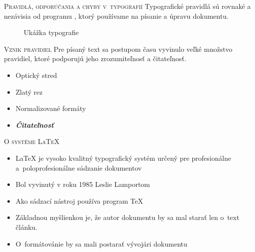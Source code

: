 \documentclass[xcolor=dvipsnames]{beamer}
\begin{document}
\begin{frame}{\textsc{\large{Pravidlá, odporúčania a chyby v~typografií}}}
	Typografické pravidlá sú rovnaké a nezávisia od programu , ktorý používame na písanie a úpravu dokumentu.
    \bigskip
    \begin{figure}
	\begin{center}
    	\caption{Ukážka typografie}
    \end{center}
\end{figure}
\end{frame}


\begin{frame}{\textsc{\large{Vznik pravidiel}}}
	Pre písaný text sa postupom času vyvinulo veľké množstvo pravidiel, ktoré podporujú jeho zrozumiteľnosť a čitateľnosť.
  \begin{itemize}
  \bigskip
		\item Optický stred
		\item Zlatý rez
		\item Normalizované formáty
    	\item \emph{\textbf{\color{Favourite_colour}Čitateľnosť}}
	\end{itemize} 
\end{frame}

\begin{frame}{\textsc{\large{O systéme \LaTeX}}}
	\begin{itemize}
		\item {\LaTeX} je vysoko kvalitný typografický systém určený pre profesionálne a~poloprofesionálne sádzanie dokumentov 
        \item Bol vyvinutý v roku 1985 Leslie Lamportom 
		\item Ako sádzací nástroj používa program \TeX
        
        \item Základnou myšlienkou je, že autor dokumentu by sa mal starať len o~text článku. 
        \item O~formátovánie by sa mali postarať vývojári dokumentu
		
	\end{itemize}
\end{frame}
\end{document}
